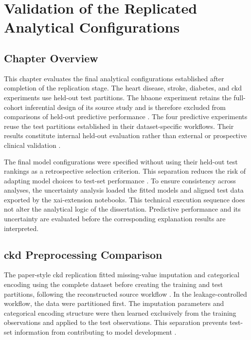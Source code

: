 \chapter{Validation of the Replicated Analytical Configurations}
\label{chap:validation_results}

\section{Chapter Overview}

This chapter evaluates the final analytical configurations established after completion of the replication stage. The heart disease, stroke, diabetes, and \gls{ckd} experiments use held-out test partitions. The \gls{hbaone} experiment retains the full-cohort inferential design of its source study and is therefore excluded from comparisons of held-out predictive performance \citep{strack_impact_2014}. The four predictive experiments reuse the test partitions established in their dataset-specific workflows. Their results constitute internal held-out evaluation rather than external or prospective clinical validation \citep{collins_tripodai_2024, moons_probastai_2025}.

The final model configurations were specified without using their held-out test rankings as a retrospective selection criterion. This separation reduces the risk of adapting model choices to test-set performance \citep{collins_tripodai_2024, moons_probastai_2025}. To ensure consistency across analyses, the uncertainty analysis loaded the fitted models and aligned test data exported by the \gls{xai}-extension notebooks. This technical execution sequence does not alter the analytical logic of the dissertation. Predictive performance and its uncertainty are evaluated before the corresponding explanation results are interpreted.


\section{\gls{ckd} Preprocessing Comparison}

The paper-style \gls{ckd} replication fitted missing-value imputation and categorical encoding using the complete dataset before creating the training and test partitions, following the reconstructed source workflow \citep{santhiya_chronic_2024}. In the leakage-controlled workflow, the data were partitioned first. The imputation parameters and categorical encoding structure were then learned exclusively from the training observations and applied to the test observations. This separation prevents test-set information from contributing to model development \citep{collins_tripodai_2024, moons_probastai_2025}.

